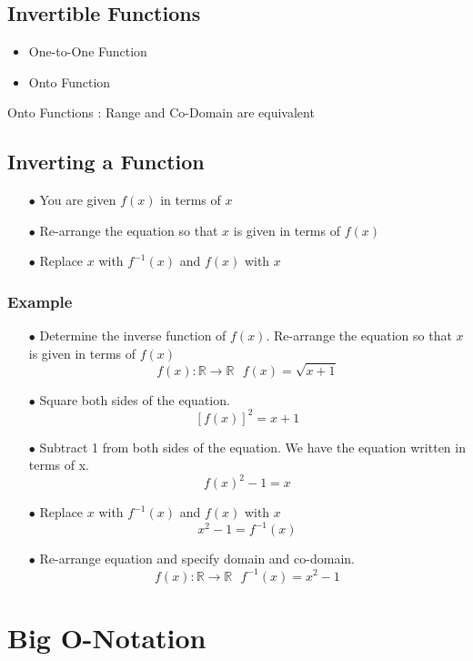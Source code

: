 \documentclass[12pt]{article}
\begin{document}
\subsection{Invertible Functions}
\begin{itemize}
 \item One-to-One Function
 \item Onto Function
\end{itemize}

Onto Functions : Range and Co-Domain are equivalent

\subsection{Inverting a Function}

\begin{itemize}
\item[$\bullet$] You are given $f(x)$ in terms of $x$
\item[$\bullet$] Re-arrange the equation so that $x$ is given in terms of $f(x)$
\item[$\bullet$] Replace $x$ with $f^{-1}(x)$ and $f(x)$ with $x$
\end{itemize}

\subsubsection{Example}
\begin{itemize}
\item[$\bullet$]Determine the inverse function of $f(x)$. Re-arrange the equation so that $x$ is given in terms of $f(x)$
\[  f(x): \mathbb{R} \rightarrow \mathbb{R}  \mbox{   } f(x)  = \sqrt{x+1} \]
\item[$\bullet$] Square both sides of the equation.
\[[f(x)]^2 = x+1 \]
\item[$\bullet$] Subtract 1 from both sides of the equation. We have the equation written in terms of x.
\[f(x)^2-1 = x \]
\item[$\bullet$] Replace $x$ with $f^{-1}(x)$ and $f(x)$ with $x$
\[x^2-1 = f^{-1}(x) \]
\item[$\bullet$] 
 Re-arrange equation and specify domain and co-domain.
\[ f(x): \mathbb{R} \rightarrow \mathbb{R}  \mbox{   }  f^{-1}(x) = x^2-1  \]
\end{itemize}
\newpage
\section{Big O-Notation}
\end{document}
